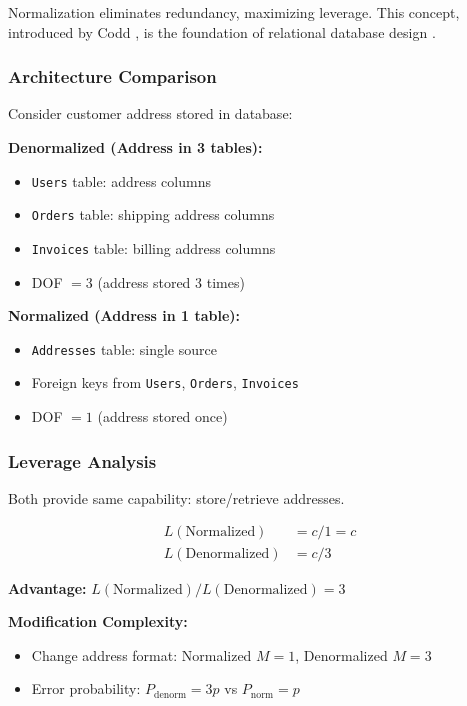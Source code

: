 Normalization eliminates redundancy, maximizing leverage. This concept, introduced by Codd \cite{codd1970relational}, is the foundation of relational database design \cite{date2003introduction}.

\subsubsection{Architecture Comparison}

Consider customer address stored in database:

\textbf{Denormalized (Address in 3 tables):}
\begin{itemize}
\item \texttt{Users} table: address columns
\item \texttt{Orders} table: shipping address columns
\item \texttt{Invoices} table: billing address columns
\item DOF $= 3$ (address stored 3 times)
\end{itemize}

\textbf{Normalized (Address in 1 table):}
\begin{itemize}
\item \texttt{Addresses} table: single source
\item Foreign keys from \texttt{Users}, \texttt{Orders}, \texttt{Invoices}
\item DOF $= 1$ (address stored once)
\end{itemize}

\subsubsection{Leverage Analysis}

Both provide same capability: store/retrieve addresses.

\begin{align*}
L(\text{Normalized}) &= c / 1 = c \\
L(\text{Denormalized}) &= c / 3
\end{align*}

\textbf{Advantage:} $L(\text{Normalized}) / L(\text{Denormalized}) = 3$

\textbf{Modification Complexity:}
\begin{itemize}
\item Change address format: Normalized $M = 1$, Denormalized $M = 3$
\item Error probability: $P_{\text{denorm}} = 3p$ vs $P_{\text{norm}} = p$
\end{itemize}

